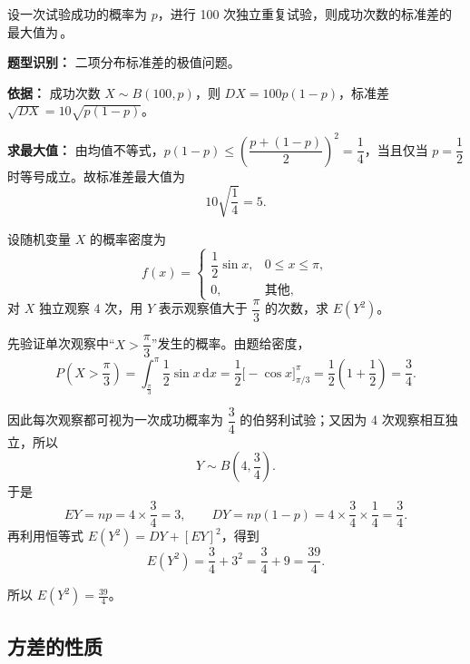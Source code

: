 ﻿\documentclass[lang=cn,11pt]{elegantbook}
\begin{document}
\begin{exercise}\label{exer:4-1-binomial}
设一次试验成功的概率为 \(p\)，进行 100 次独立重复试验，则成功次数的标准差的最大值为\,\underline{\hspace{2cm}}。
\end{exercise}
\begin{solution}
\textbf{题型识别：} 二项分布标准差的极值问题。

\textbf{依据：} 成功次数 $X \sim B(100,p)$，则 $DX = 100p(1-p)$，标准差 $\sqrt{DX} = 10\sqrt{p(1-p)}$。

\textbf{求最大值：} 由均值不等式，$p(1-p) \leqslant \left(\dfrac{p + (1-p)}{2}\right)^2 = \dfrac{1}{4}$，当且仅当 $p = \dfrac{1}{2}$ 时等号成立。故标准差最大值为
\[
10\sqrt{\frac{1}{4}} = 5.
\]
\end{solution}

\begin{exercise}\label{exer:4-2-cos}
设随机变量 \(X\) 的概率密度为
\[
f(x) = \begin{cases} \dfrac{1}{2}\sin x, & 0 \leqslant x \leqslant \pi, \\[4pt] 0, & \text{其他}, \end{cases}
\]
对 \(X\) 独立观察 4 次，用 \(Y\) 表示观察值大于 \(\dfrac{\pi}{3}\) 的次数，求 \(E(Y^2)\)。
\end{exercise}
\begin{solution}
先验证单次观察中“\(X>\dfrac{\pi}{3}\)”发生的概率。由题给密度，
\[
P\!\left(X > \frac{\pi}{3}\right) = \int_{\frac{\pi}{3}}^{\pi} \frac{1}{2}\sin x\,\mathrm{d}x
= \frac12\bigl[-\cos x\bigr]_{\pi/3}^{\pi}
= \frac12\left(1+\frac12\right)
= \frac34.
\]

因此每次观察都可视为一次成功概率为 \(\dfrac34\) 的伯努利试验；又因为 4 次观察相互独立，所以
\[
Y\sim B\!\left(4,\frac34\right).
\]
于是
\[
EY=np=4\times \frac34=3,\qquad DY=np(1-p)=4\times \frac34\times \frac14=\frac34.
\]
再利用恒等式 \(E(Y^2)=DY+[EY]^2\)，得到
\[
E(Y^2)=\frac34+3^2=\frac34+9=\frac{39}{4}.
\]

所以 \(E(Y^2)=\frac{39}{4}\)。
\end{solution}



\subsection{方差的性质}
\end{document}
